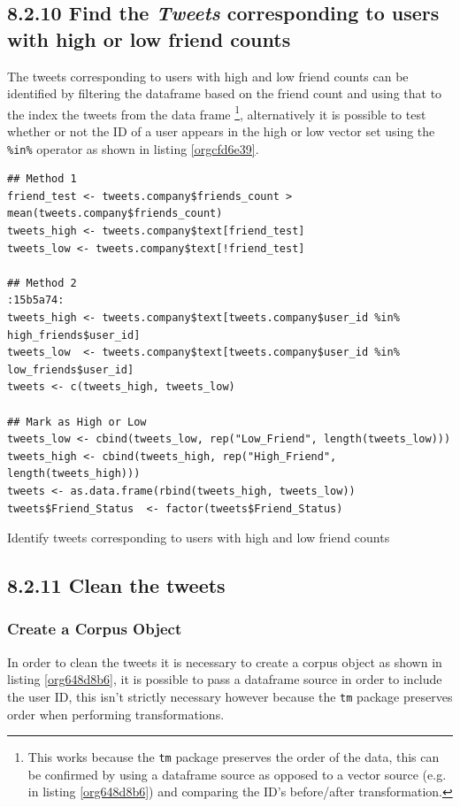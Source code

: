 \documentclass[11pt]{article}
\begin{document}
\subsection{8.2.10 Find the \emph{Tweets} corresponding to users with high or low friend counts}
\label{sec:orgf25d54a}
The tweets corresponding to users with high and low friend counts can be
identified by filtering the dataframe based on the friend count and using that
to the index the tweets from the data frame \footnote{This works because the \texttt{tm} package preserves the order of the data, this can be confirmed by using a dataframe source as opposed to a vector source (e.g. in listing \ref{org648d8b6}) and comparing the ID's before/after transformation.}, alternatively it is possible
to test whether or not the ID of a user appears in the high or low vector
set using the \texttt{\%in\%} operator as shown in listing \ref{orgcfd6e39}.

\begin{listing}[htbp]
\begin{verbatim}
## Method 1
friend_test <- tweets.company$friends_count > mean(tweets.company$friends_count)
tweets_high <- tweets.company$text[friend_test]
tweets_low <- tweets.company$text[!friend_test]

## Method 2                                                                 :15b5a74:
tweets_high <- tweets.company$text[tweets.company$user_id %in%  high_friends$user_id]
tweets_low  <- tweets.company$text[tweets.company$user_id %in%  low_friends$user_id]
tweets <- c(tweets_high, tweets_low)

## Mark as High or Low
tweets_low <- cbind(tweets_low, rep("Low_Friend", length(tweets_low)))
tweets_high <- cbind(tweets_high, rep("High_Friend", length(tweets_high)))
tweets <- as.data.frame(rbind(tweets_high, tweets_low))
tweets$Friend_Status  <- factor(tweets$Friend_Status)
\end{verbatim}
\caption{\label{orgcfd6e39}Identify tweets corresponding to users with high and low friend counts}
\end{listing}

\subsection{8.2.11 Clean the tweets}
\label{sec:org64acb3b}
\subsubsection{Create a Corpus Object}
\label{sec:org486e4f3}
In order to clean the tweets it is necessary to create a corpus object as shown in listing \ref{org648d8b6}, it is possible to pass a dataframe source in order to include the user ID, this isn't strictly necessary however because the \texttt{tm} package preserves order when performing transformations.
\end{document}
